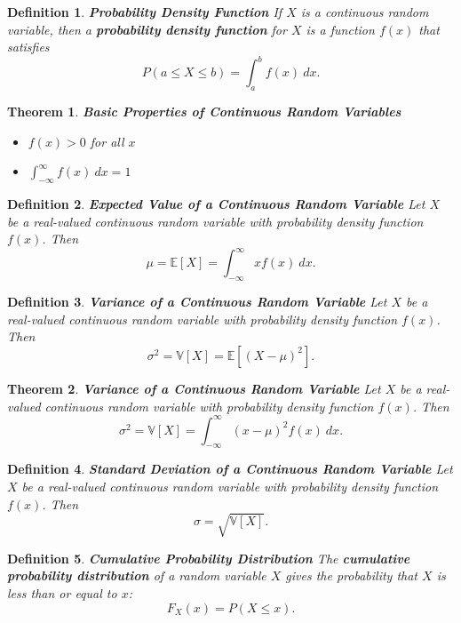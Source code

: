 \documentclass[letterpaper,10pt]{article}
\newtheorem{thm}{Theorem}
\newtheorem{df}{Definition}[section]
\begin{document}
\begin{df}{\bf Probability Density Function}
If $X$ is a continuous random variable, then a {\bf probability density function} for $X$ is a function $f(x)$ that satisfies $$P(a\leq X\leq b)=\int_a^b f(x)\:dx.$$
\end{df}

\begin{thm}{\bf Basic Properties of Continuous Random Variables}

\begin{itemize}

\item $f(x)>0$ for all $x$

\item $\displaystyle\int_{-\infty}^{\infty}f(x)\:dx=1$

\end{itemize}

\end{thm}

\begin{df}{\bf Expected Value of a Continuous Random Variable}
Let $X$ be a real-valued continuous random variable with probability density function $f(x)$.  Then $$\mu=\mathbb{E}[X]=\int_{-\infty}^{\infty}xf(x)\:dx.$$
\end{df}

\begin{df}{\bf Variance of a Continuous Random Variable}
Let $X$ be a real-valued continuous random variable with probability density function $f(x)$.  Then $$\sigma^2=\mathbb{V}[X]=\mathbb{E}[(X-\mu)^2].$$
\end{df}

\begin{thm}{\bf Variance of a Continuous Random Variable}
Let $X$ be a real-valued continuous random variable with probability density function $f(x)$.  Then $$\sigma^2=\mathbb{V}[X]=\int_{-\infty}^{\infty}(x-\mu)^2 f(x)\:dx.$$
\end{thm}

\begin{df}{\bf Standard Deviation of a Continuous Random Variable}
Let $X$ be a real-valued continuous random variable with probability density function $f(x)$.  Then $$\sigma=\sqrt{\mathbb{V}[X]}.$$
\end{df}

\begin{df}{\bf Cumulative Probability Distribution}
The {\bf cumulative probability distribution} of a random variable $X$ gives the probability that $X$ is less than or equal to $x$:  $$F_X(x)=P(X\leq x).$$
\end{df}
\end{document}
